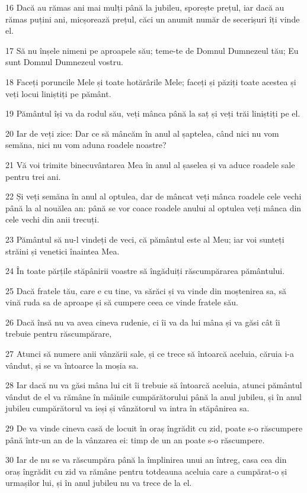 \par 16 Dacă au rămas ani mai mulți până la jubileu, sporește prețul, iar dacă au rămas puțini ani, micșorează prețul, căci un anumit număr de secerișuri îți vinde el.
\par 17 Să nu înșele nimeni pe aproapele său; teme-te de Domnul Dumnezeul tău; Eu sunt Domnul Dumnezeul vostru.
\par 18 Faceți poruncile Mele și toate hotărârile Mele; faceți și păziți toate acestea și veți locui liniștiți pe pământ.
\par 19 Pământul își va da rodul său, veți mânca până la saț și veți trăi liniștiți pe el.
\par 20 Iar de veți zice: Dar ce să mâncăm în anul al șaptelea, când nici nu vom semăna, nici nu vom aduna roadele noastre?
\par 21 Vă voi trimite binecuvântarea Mea în anul al șaselea și va aduce roadele sale pentru trei ani.
\par 22 Și veți semăna în anul al optulea, dar de mâncat veți mânca roadele cele vechi până la al nouălea an: până se vor coace roadele anului al optulea veți mânca din cele vechi din anii trecuți.
\par 23 Pământul să nu-l vindeți de veci, că pământul este al Meu; iar voi sunteți străini și venetici înaintea Mea.
\par 24 În toate părțile stăpânirii voastre să îngăduiți răscumpărarea pământului.
\par 25 Dacă fratele tău, care e cu tine, va sărăci și va vinde din moștenirea sa, să vină ruda sa de aproape și să cumpere ceea ce vinde fratele său.
\par 26 Dacă însă nu va avea cineva rudenie, ci îi va da lui mâna și va găsi cât îi trebuie pentru răscumpărare,
\par 27 Atunci să numere anii vânzării sale, și ce trece să întoarcă aceluia, căruia i-a vândut, și se va întoarce la moșia sa.
\par 28 Iar dacă nu va găsi mâna lui cit îi trebuie să întoarcă aceluia, atunci pământul vândut de el va rămâne în mâinile cumpărătorului până la anul jubileu, și în anul jubileu cumpărătorul va ieși și vânzătorul va intra în stăpânirea sa.
\par 29 De va vinde cineva casă de locuit în oraș îngrădit cu zid, poate s-o răscumpere până într-un an de la vânzarea ei: timp de un an poate s-o răscumpere.
\par 30 Iar de nu se va răscumpăra până la împlinirea unui an întreg, casa cea din oraș îngrădit cu zid va rămâne pentru totdeauna aceluia care a cumpărat-o și urmașilor lui, și în anul jubileu nu va trece de la el.
